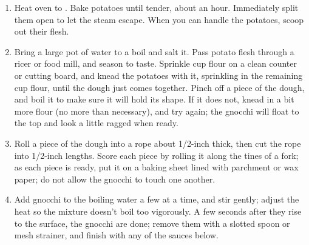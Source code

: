 

\begin{ingredients}
\end{ingredients}


\begin{recipe}
  \begin{enumerate}

  \item Heat oven to .  Bake potatoes until tender, about
    an hour.  Immediately split them open to let the steam
    escape. When you can handle the potatoes, scoop out their flesh.

  \item Bring a large pot of water to a boil and salt it. Pass potato
    flesh through a ricer or food mill, and season to taste. Sprinkle
    \fracH cup flour on a clean counter or cutting board, and knead the
    potatoes with it, sprinkling in the remaining \fracQ cup flour, until
    the dough just comes together. Pinch off a piece of the dough, and
    boil it to make sure it will hold its shape. If it does not, knead
    in a bit more flour (no more than necessary), and try again; the
    gnocchi will float to the top and look a little ragged when ready.

  \item Roll a piece of the dough into a rope about 1/2-inch thick,
    then cut the rope into 1/2-inch lengths. Score each piece by
    rolling it along the tines of a fork; as each piece is ready, put
    it on a baking sheet lined with parchment or wax paper; do not
    allow the gnocchi to touch one another.

  \item Add gnocchi to the boiling water a few at a time, and stir
    gently; adjust the heat so the mixture doesn’t boil too
    vigorously. A few seconds after they rise to the surface, the
    gnocchi are done; remove them with a slotted spoon or mesh
    strainer, and finish with any of the sauces below.

  \end{enumerate}
\end{recipe}


